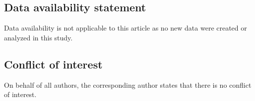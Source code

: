\documentclass[british,11pt,a4paper]{amsart}
\numberwithin{equation}{section}
\numberwithin{theorem}{section}
\theoremstyle{definition}
\theoremstyle{remark}
\begin{document}
\subsection*{Data availability statement} Data availability is not applicable to this article 
as no new data were created or analyzed in this study.

\subsection*{Conflict of interest} On behalf of all authors, the corresponding author
states that there is no conflict of interest. 

\providecommand{\mr}[1]{\href{http://www.ams.org/mathscinet-getitem?mr=#1}{MR~#1}}
\providecommand{\zbl}[1]{\href{http://www.zentralblatt-math.org/zmath/en/search/?q=an:#1}{zbM~#1}}
\providecommand{\arxiv}[1]{\href{http://www.arxiv.org/abs/#1}{arXiv:#1 }}
\providecommand{\doi}[1]{\href{http://dx.doi.org/#1}{DOI~#1}}
\providecommand{\href}[2]{#2}
\end{document}
